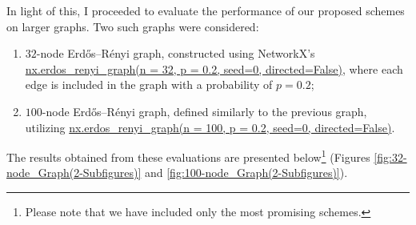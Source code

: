 In light of this, I proceeded to evaluate the performance of our proposed schemes on larger graphs. Two such graphs were considered:
\begin{enumerate}
    \item $32$-node Erdős–Rényi graph, constructed using NetworkX's {\hypersetup{urlcolor=black}\url{nx.erdos\_renyi\_graph(n = 32, p = 0.2, seed=0, directed=False)}}, where each edge is included in the graph with a probability of $p = 0.2$;
    \item $100$-node Erdős–Rényi graph, defined similarly to the previous graph, utilizing {\hypersetup{urlcolor=black}\url{nx.erdos\_renyi\_graph(n = 100, p = 0.2, seed=0, directed=False)}}.
\end{enumerate}
The results obtained from these evaluations are presented below\footnote{Please note that we have included only the most promising schemes.} (Figures \ref{fig:32-node_Graph(2-Subfigures)} and \ref{fig:100-node_Graph(2-Subfigures)}).

